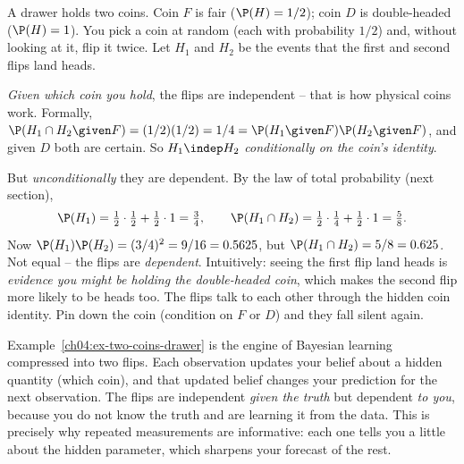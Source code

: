 \begin{example}
\label{ch04:ex-two-coins-drawer}
A drawer holds two coins. Coin $F$ is fair ($\P(H) = 1/2$); coin $D$ is double-headed ($\P(H) = 1$). You pick a coin at random (each with probability $1/2$) and, without looking at it, flip it twice. Let $H_1$ and $H_2$ be the events that the first and second flips land heads.

\emph{Given which coin you hold}, the flips are independent -- that is how physical coins work. Formally, $\P(H_1 \cap H_2 \given F) = (1/2)(1/2) = 1/4 = \P(H_1\given F)\P(H_2\given F)$, and given $D$ both are certain. So $H_1 \indep H_2$ \emph{conditionally on the coin's identity}.

But \emph{unconditionally} they are dependent. By the law of total probability (next section),
\[
\P(H_1) = \tfrac12\cdot\tfrac12 + \tfrac12\cdot 1 = \tfrac34, \qquad
\P(H_1\cap H_2) = \tfrac12\cdot\tfrac14 + \tfrac12\cdot 1 = \tfrac58.
\]
Now $\P(H_1)\P(H_2) = (3/4)^2 = 9/16 = 0.5625$, but $\P(H_1\cap H_2) = 5/8 = 0.625$. Not equal -- the flips are \emph{dependent}. Intuitively: seeing the first flip land heads is \emph{evidence you might be holding the double-headed coin}, which makes the second flip more likely to be heads too. The flips talk to each other through the hidden coin identity. Pin down the coin (condition on $F$ or $D$) and they fall silent again.
\end{example}

\begin{happeningbox}
Example~\ref{ch04:ex-two-coins-drawer} is the engine of Bayesian learning compressed into two flips. Each observation updates your belief about a hidden quantity (which coin), and that updated belief changes your prediction for the next observation. The flips are independent \emph{given the truth} but dependent \emph{to you}, because you do not know the truth and are learning it from the data. This is precisely why repeated measurements are informative: each one tells you a little about the hidden parameter, which sharpens your forecast of the rest.
\end{happeningbox}

